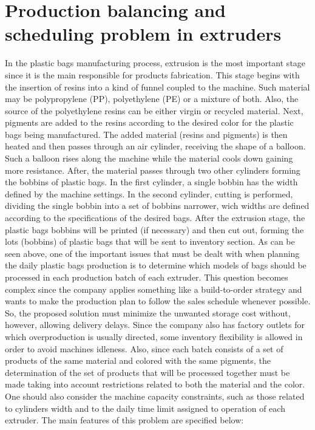 \section{Production balancing and scheduling problem in extruders}
\label{sec:1}

In the plastic bags manufacturing process, extrusion is the most important stage since it is the main responsible for products fabrication. This stage begins with the insertion of resins into a kind of funnel coupled to the machine. Such material may be polypropylene (PP), polyethylene (PE) or a mixture of both. Also, the source of the polyethylene resins can be either virgin or recycled material. Next, pigments are added to the resins according to the desired color for the plastic bags being manufactured. The added material (resins and pigments) is then heated and then passes through an air cylinder, receiving the shape of a balloon. Such a balloon rises along the machine while the material cools down gaining more resistance. After, the material passes through two other cylinders forming the bobbins of plastic bags. In the first cylinder, a single bobbin has the width defined by the machine
settings. In the second cylinder, cutting is performed, dividing the single bobbin into a set of bobbins narrower, wich widths are defined according to the specifications of the desired bags. After the extrusion stage, the plastic bags bobbins will be printed (if necessary) and then cut out, forming the lots (bobbins) of plastic bags that will be sent to inventory section. As can be seen above, one of the important issues that must be dealt with when planning the daily plastic bags production is to determine which models of bags should be processed in each production batch of each extruder. This question becomes complex since the company applies something like a build-to-order strategy and wants to make the production plan to follow the sales schedule whenever possible. So, the proposed solution must minimize the unwanted storage cost without, however, allowing delivery delays. Since the company also has factory outlets for which overproduction is usually directed, some inventory flexibility is allowed in order to avoid machines idleness. Also, since each batch consists of a set of products of the same material and colored with the same pigments, the determination of the set of products that will be processed together must be made taking into account restrictions related to both the material and the color. One should also consider the machine capacity constraints, such as those related to cylinders width and to the daily time limit assigned to operation of each extruder. The main features of this problem are specified below:

